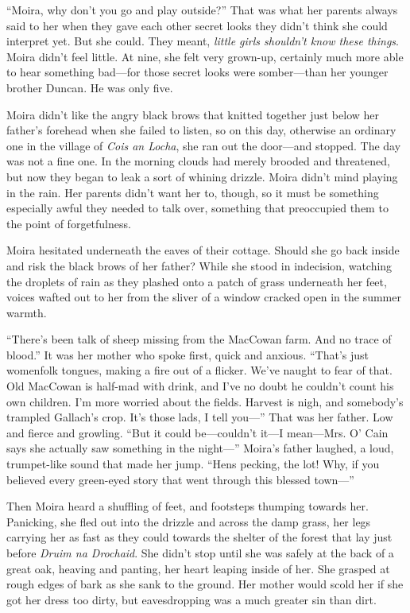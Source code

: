 \documentclass[letterpaper, twoside, 12pt]{memoir}
\begin{document}
“Moira, why don’t you go and play outside?”
That was what her parents always said to her when they gave each other secret looks they didn’t think she could interpret yet. But she could. They meant, \textit{little girls shouldn’t know these things}. Moira didn’t feel little. At nine, she felt very grown-up, certainly much more able to hear something bad---for those secret looks were somber---than her younger brother Duncan. He was only five.

Moira didn’t like the angry black brows that knitted together just below her father’s forehead when she failed to listen, so on this day, otherwise an ordinary one in the village of \textit{Cois an Locha}, she ran out the door---and stopped.
The day was not a fine one. In the morning clouds had merely brooded and threatened, but now they began to leak a sort of whining drizzle. Moira didn’t mind playing in the rain. Her parents didn’t want her to, though, so it must be something especially awful they needed to talk over, something that preoccupied them to the point of forgetfulness.

Moira hesitated underneath the eaves of their cottage. Should she go back inside and risk the black brows of her father? While she stood in indecision, watching the droplets of rain as they plashed onto a patch of grass underneath her feet, voices wafted out to her from the sliver of a window cracked open in the summer warmth.

“There’s been talk of sheep missing from the MacCowan farm. And no trace of blood.” It was her mother who spoke first, quick and anxious.
“That’s just womenfolk tongues, making a fire out of a flicker. We’ve naught to fear of that. Old MacCowan is half-mad with drink, and I’ve no doubt he couldn’t count his own children. I’m more worried about the fields. Harvest is nigh, and somebody’s trampled Gallach’s crop. It’s those lads, I tell you---” That was her father. Low and fierce and growling.
“But it could be---couldn’t it---I mean---Mrs. O’ Cain says she actually saw something in the night---”
Moira’s father laughed, a loud, trumpet-like sound that made her jump. “Hens pecking, the lot! Why, if you believed every green-eyed story that went through this blessed town---” 

Then Moira heard a shuffling of feet, and footsteps thumping towards her. Panicking, she fled out into the drizzle and across the damp grass, her legs carrying her as fast as they could towards the shelter of the forest that lay just before \textit{Druim na Drochaid}. 
She didn’t stop until she was safely at the back of a great oak, heaving and panting, her heart leaping inside of her. She grasped at rough edges of bark as she sank to the ground. Her mother would scold her if she got her dress too dirty, but eavesdropping was a much greater sin than dirt.
\end{document}
